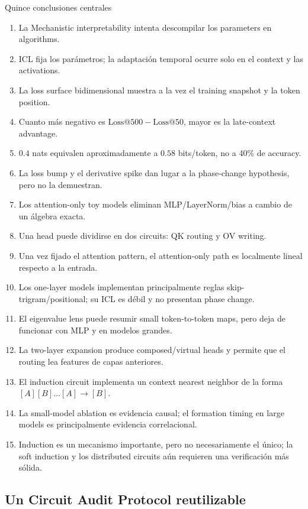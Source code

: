 \documentclass[a4paper]{article}
\begin{document}
\begin{importantbox}{Quince conclusiones centrales}
\begin{enumerate}
  \item La Mechanistic interpretability intenta descompilar los parameters en algorithms.
  \item ICL fija los parámetros; la adaptación temporal ocurre solo en el context y las activations.
  \item La loss surface bidimensional muestra a la vez el training snapshot y la token position.
  \item Cuanto más negativo es $\mathrm{Loss@500}-\mathrm{Loss@50}$, mayor es la late-context advantage.
  \item $0.4$ nats equivalen aproximadamente a $0.58$ bits/token, no a 40\% de accuracy.
  \item La loss bump y el derivative spike dan lugar a la phase-change hypothesis, pero no la demuestran.
  \item Los attention-only toy models eliminan MLP/LayerNorm/bias a cambio de un álgebra exacta.
  \item Una head puede dividirse en dos circuits: QK routing y OV writing.
  \item Una vez fijado el attention pattern, el attention-only path es localmente lineal respecto a la entrada.
  \item Los one-layer models implementan principalmente reglas skip-trigram/positional; su ICL es débil y no presentan phase change.
  \item El eigenvalue lens puede resumir small token-to-token maps, pero deja de funcionar con MLP y en modelos grandes.
  \item La two-layer expansion produce composed/virtual heads y permite que el routing lea features de capas anteriores.
  \item El induction circuit implementa un context nearest neighbor de la forma $[A][B]\ldots[A]\to[B]$.
  \item La small-model ablation es evidencia causal; el formation timing en large models es principalmente evidencia correlacional.
  \item Induction es un mecanismo importante, pero no necesariamente el único; la soft induction y los distributed circuits aún requieren una verificación más sólida.
\end{enumerate}
\end{importantbox}

\subsection{Un Circuit Audit Protocol reutilizable}
\end{document}
